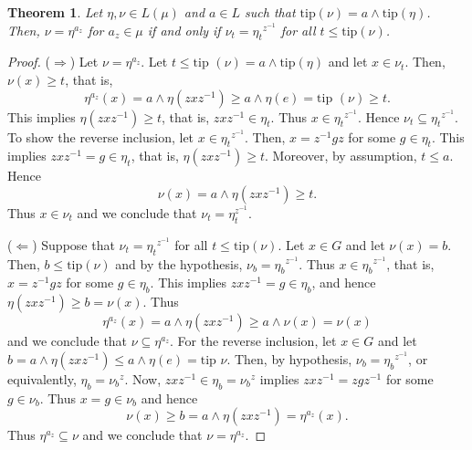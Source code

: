 \documentclass[10pt]{article}
\theoremstyle{plain}
\newtheorem{theorem}{Theorem}[section]
\theoremstyle{definition}
\theoremstyle{remark}
\theoremstyle{case}
\begin{document}
\begin{theorem}\label{lvl_conj}
	Let $\eta, \nu \in L(\mu)$ and $a \in L$ such that $\text{tip}(\nu) = a \wedge \text{tip}(\eta)$. Then, $\nu=\eta^{a_z}$ for $a_z \in \mu$ if and only if $\nu_t = {\eta_t}^{z^{-1}}$ for all $t \leq \text{tip}(\nu)$.
\end{theorem}
\begin{proof}
	($\Rightarrow$) Let $\nu=\eta^{a_z}$. Let $t \leq \text{tip~}{(\nu)} = a \wedge \text{tip}(\eta)$ and let $x \in \nu_t$. Then, $\nu(x) \geq t$, that is, 
	\[ \eta^{a_z}(x) = a \wedge \eta(zxz^{-1}) \geq a \wedge \eta(e) = \text{tip~}(\nu)\geq t. \]
	This implies $\eta(zxz^{-1}) \geq t$, that is, $zxz^{-1} \in \eta_t$. Thus $x \in {\eta_t}^{z^{-1}}$. 
	Hence $\nu_t \subseteq {\eta_t}^{z^{-1}}.$
	To show the reverse inclusion, let $x \in {\eta_t}^{z^{-1}}$. Then, $x = z^{-1}gz$ for some $g \in \eta_t$.	This implies $zxz^{-1} = g \in \eta_t$, that is, $\eta(zxz^{-1}) \geq t$. Moreover, by assumption, $t \leq a$. Hence
	\[ \nu(x) = a \wedge \eta(zxz^{-1}) \geq t. \]
	Thus $x \in \nu_t$ and we conclude that $\nu_t = {\eta^{z^{-1}}_t}$.
	
	\noindent ($\Leftarrow$) Suppose that $\nu_t = {\eta_t}^{z^{-1}}$ for all $t \leq \text{tip}(\nu)$. Let $x \in G$ and let $\nu(x) = b$. Then, $b \leq \text{tip}(\nu)$ and by the hypothesis, $\nu_b = {\eta_b}^{z^{-1}}$. Thus $x \in {\eta_b}^{z^{-1}}$, that is, $x = z^{-1}gz$ for some $g \in \eta_b$. This implies	$zxz^{-1} = g \in \eta_b$, and hence $\eta(zxz^{-1}) \geq b = \nu(x)$. Thus 
	\[ \eta^{a_z}(x) = a \wedge \eta(zxz^{-1}) \geq a \wedge \nu(x) = \nu(x) \]
	and we conclude that $\nu \subseteq \eta^{a_z}$. For the reverse inclusion, let $x \in G$ and let $b = a \wedge \eta(zxz^{-1}) \leq a \wedge \eta(e)=\text{tip~}\nu$. Then, by hypothesis, $\nu_b = {\eta_b}^{z^{-1}}$, or equivalently, $\eta_b = {\nu_b}^z$. Now, $zxz^{-1} \in \eta_b = {\nu_b}^z$ implies	$zxz^{-1} = zgz^{-1}$ for some $g \in \nu_b$. Thus $x = g \in \nu_b$ and hence 
	\[ \nu(x) \geq b = a \wedge \eta(zxz^{-1}) = \eta^{a_z}(x). \]
	Thus $\eta^{a_z} \subseteq \nu$ and we conclude that $\nu = \eta^{a_z}$.
\end{proof}
\end{document}
